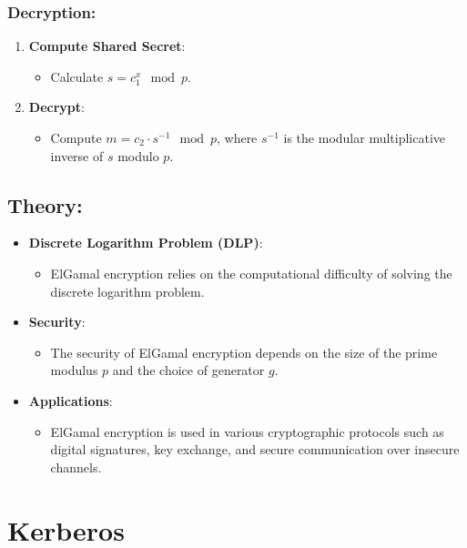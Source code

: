 \documentclass[11pt]{article}
\begin{document}
\subsubsection{Decryption:}
\begin{enumerate}
    \item \textbf{Compute Shared Secret}:
    \begin{itemize}
        \item Calculate \( s = c_1^x \mod p \).
    \end{itemize}
    
    \item \textbf{Decrypt}:
    \begin{itemize}
        \item Compute \( m = c_2 \cdot s^{-1} \mod p \), where \( s^{-1} \) is the modular multiplicative inverse of \( s \) modulo \( p \).
    \end{itemize}
\end{enumerate}

\subsection{Theory:}
\begin{itemize}
    \item \textbf{Discrete Logarithm Problem (DLP)}:
    \begin{itemize}
        \item ElGamal encryption relies on the computational difficulty of solving the discrete logarithm problem.
    \end{itemize}
    
    \item \textbf{Security}:
    \begin{itemize}
        \item The security of ElGamal encryption depends on the size of the prime modulus \( p \) and the choice of generator \( g \).
    \end{itemize}
    
    \item \textbf{Applications}:
    \begin{itemize}
        \item ElGamal encryption is used in various cryptographic protocols such as digital signatures, key exchange, and secure communication over insecure channels.
    \end{itemize}
\end{itemize}

\section{Kerberos}
\end{document}
